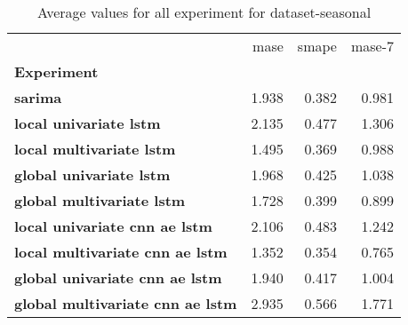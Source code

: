 \begin{table}[h]
\centering
\caption{Average values for all experiment for dataset-seasonal}
\label{table:Average-metric-dataset-seasonal}
\begin{tabular}{lrrr}
\toprule
{} &   mase &  smape &  mase-7 \\
\textbf{Experiment                     } &        &        &         \\
\midrule
\textbf{sarima                         } &  1.938 &  0.382 &   0.981 \\
\textbf{local univariate lstm          } &  2.135 &  0.477 &   1.306 \\
\textbf{local multivariate lstm        } &  1.495 &  0.369 &   0.988 \\
\textbf{global univariate lstm         } &  1.968 &  0.425 &   1.038 \\
\textbf{global multivariate lstm       } &  1.728 &  0.399 &   0.899 \\
\textbf{local univariate cnn ae lstm   } &  2.106 &  0.483 &   1.242 \\
\textbf{local multivariate cnn ae lstm } &  1.352 &  0.354 &   0.765 \\
\textbf{global univariate cnn ae lstm  } &  1.940 &  0.417 &   1.004 \\
\textbf{global multivariate cnn ae lstm} &  2.935 &  0.566 &   1.771 \\
\bottomrule
\end{tabular}
\end{table}
